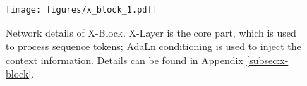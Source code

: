 \begin{figure}[h]
    \centering
    \texttt{[image: figures/x\_block\_1.pdf]}
    \caption{Network details of X-Block. X-Layer is the core part, which is used to process sequence tokens; AdaLn conditioning is used to inject the context information. Details can be found in Appendix \ref{subsec:x-block}.}
    \label{fig:x_block}
\end{figure}